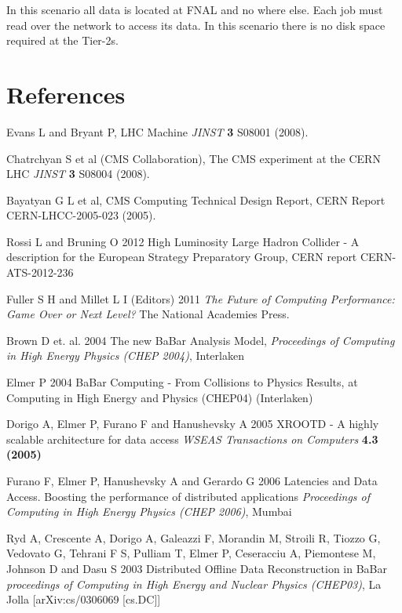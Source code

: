 \documentclass[a4paper]{jpconf}
\begin{document}
In this scenario all data is located at FNAL and no where else. Each
job must read over the network to access its data. In this scenario
there is no disk space required at the Tier-2s.


\section*{References}
\begin{thebibliography}{9}
 Evans L and Bryant P,  LHC Machine {\it JINST}
  {\bf 3} S08001 (2008).

 Chatrchyan S et al (CMS Collaboration),  The CMS
  experiment at the CERN LHC {\it JINST} {\bf 3} S08004 (2008).

 Bayatyan G L et al,  CMS Computing Technical Design
  Report, CERN Report CERN-LHCC-2005-023 (2005).

 Rossi L and Bruning O 2012 High Luminosity Large Hadron
  Collider - A description for the European Strategy Preparatory
  Group, CERN report CERN-ATS-2012-236

 Fuller S H and Millet L I (Editors) 2011 {\it The
  Future of Computing Performance:  Game Over or Next Level?}
  The National Academies Press.

 Brown D et. al. 2004 The new BaBar Analysis
  Model, {\it Proceedings of Computing in High Energy Physics (CHEP
    2004)}, Interlaken 

 Elmer P 2004 BaBar Computing - From Collisions to
  Physics Results, at Computing in High Energy and Physics (CHEP04)
  (Interlaken)

 Dorigo A, Elmer P, Furano F and Hanushevsky A 2005
  XROOTD - A highly scalable architecture for data access {\it WSEAS
    Transactions on Computers} {\bf 4.3 (2005)}

 Furano F, Elmer P, Hanushevsky A and Gerardo G 2006
  Latencies and Data Access. Boosting the performance of distributed
  applications {\it Proceedings of Computing in High Energy Physics
    (CHEP 2006)}, Mumbai

 Ryd A, Crescente A, Dorigo A, Galeazzi F, Morandin
  M, Stroili R, Tiozzo G, Vedovato G, Tehrani F S, Pulliam T, Elmer P,
  Ceseracciu A, Piemontese M, Johnson D and Dasu S 2003 Distributed
  Offline Data Reconstruction in BaBar {\it proceedings of Computing
    in High Energy and Nuclear Physics (CHEP03)}, La Jolla
  [arXiv:cs/0306069 [cs.DC]]


\end{thebibliography}
\end{document}

